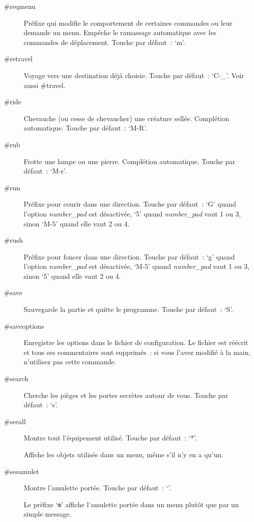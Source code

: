 \documentclass[titlepage]{article}
\begin{document}
\begin{description}
\item[{\#reqmenu}]
Préfixe qui modifie le comportement de certaines commandes ou leur demande
un menu.
Empêche le ramassage automatique avec les commandes de déplacement.
Touche par défaut~: `m'.

\item[{\#retravel}]
Voyage vers une destination déjà choisie.
Touche par défaut~: `C-\_'.
Voir aussi \#travel.

\item[{\#ride}]
Chevauche (ou cesse de chevaucher) une créature sellée.
Complétion automatique.
Touche par défaut~: `M-R'.

\item[{\#rub}]
Frotte une lampe ou une pierre.
Complétion automatique.
Touche par défaut~: `M-r'.

\item[{\#run}]
Préfixe pour courir dans une direction.
Touche par défaut~: `G' quand l'option
\textit{number\_pad}
est désactivée,
`5' quand
\textit{number\_pad}
vaut 1 ou 3,
sinon `M-5' quand elle vaut 2 ou 4.

\item[{\#rush}]
Préfixe pour foncer dans une direction.
Touche par défaut~: `g' quand l'option
\textit{number\_pad}
est désactivée,
`M-5' quand
\textit{number\_pad}
vaut 1 ou 3,
sinon `5' quand elle vaut 2 ou 4.

\item[{\#save}]
Sauvegarde la partie et quitte le programme.
Touche par défaut~: `S'.

\item[{\#saveoptions}]
Enregistre les options dans le fichier de configuration.
Le fichier est réécrit et tous ses commentaires sont supprimés~: si vous
l'avez modifié à la main, n'utilisez pas cette commande.

\item[{\#search}]
Cherche les pièges et les portes secrètes autour de vous.
Touche par défaut~: `s'.

\item[{\#seeall}]
Montre tout l'équipement utilisé.
Touche par défaut~: `*'.


Affiche les objets utilisés dans un menu, même s'il n'y en a qu'un.

\item[{\#seeamulet}]
Montre l'amulette portée.
Touche par défaut~: `\textquotedbl{}'. 


Le préfixe `\texttt{m}' affiche l'amulette portée dans un menu plutôt
que par un simple message.


\end{description}
\end{document}

